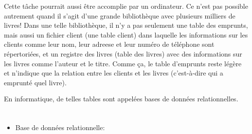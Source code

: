 {{Cette tâche pourrait aussi être accomplie par un ordinateur. Ce n’est pas possible autrement quand il s’agit d’une grande bibliothèque avec plusieurs milliers de livres! Dans une telle bibliothèque, il n’y a pas seulement une table des emprunts, mais aussi un fichier client (une table client) dans laquelle les informations sur les clients comme leur nom, leur adreese et leur numéro de téléphone sont répertoriées, et un registre des livres (table des livres) avec des informations sur les livres comme l’auteur et le titre. Comme ça, le table d’emprunts reste légère et n’indique que la relation entre les clients et les livres (c’est-à-dire qui a emprunté quel livre).

En informatique, de telles tables sont appelées bases de données relationnelles.



\section*{\BrochureWebsitesAndKeywords}
{\raggedright
\begin{itemize}
  \item Base de données relationnelle: \href{https://fr.wikipedia.org/wiki/Base_de_donn\%C3\%A9es_relationnelle}{}
\end{itemize}


}

}{}

\def\AuthorPohlW{} %
\def\AuthorAlmajhadE{} %
\def\AuthorBergsveinsdottirL{} %
\def\AuthorLacherR{} %
\def\AuthorSchluterK{} %
\def\AuthorDatzkoS{} %
\def\AuthorPelletE{} %

\newpage}{}
